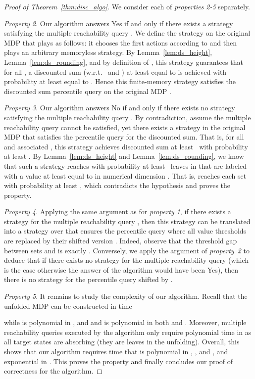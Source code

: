 \documentclass{llncs}
\begin{document}
\begin{proof}[Proof of Theorem~\ref{thm:disc_algo}] We consider each of \textit{properties 2-5} separately.

\textit{Property 2}. Our algorithm answers \textsf{Yes} if and only if there exists a strategy  satisfying the multiple reachability query . We define the strategy  on the original MDP  that plays as follows: it chooses the  first actions according to  and then plays an arbitrary memoryless strategy. By Lemma~\ref{lem:ds_height}, Lemma~\ref{lem:ds_rounding}, and by definition of , this strategy guarantees that for all , a discounted sum (w.r.t.~ and ) at least equal to  is achieved with probability at least equal to . Hence this finite-memory strategy  satisfies the discounted sum percentile query on the original MDP .
	
\textit{Property 3}. Our algorithm answers \textsf{No} if and only if there exists no strategy  satisfying the multiple reachability query . By contradiction, assume the multiple reachability query cannot be satisfied, yet there exists a strategy  in the original MDP  that satisfies the percentile query for the discounted sum. That is, for all  and associated , this strategy achieves discounted sum at least~ with probability at least . By Lemma~\ref{lem:ds_height} and Lemma~\ref{lem:ds_rounding}, we know that such a strategy reaches with probability at least~ leaves in  that are labeled with a value at least equal to  in numerical dimension . That is,  reaches each set  with probability at least , which contradicts the hypothesis and proves the property.

\textit{Property 4}. Applying the same argument as for \textit{property 1}, if there exists a strategy  for the multiple reachability query , then this strategy can be translated into a strategy  over  that ensures the percentile query where all value thresholds  are replaced by their shifted version . Indeed, observe that the threshold gap between sets  and  is exactly . Conversely, we apply the argument of \textit{property~2} to deduce that if there exists no strategy for the multiple reachability query  (which is the case otherwise the answer of the algorithm would have been \textsf{Yes}), then there is no strategy for the percentile query shifted by . 

\textit{Property 5}. It remains to study the complexity of our algorithm. Recall that the unfolded MDP  can be constructed in time

while  is polynomial in ,  and  and  is polynomial in both  and . Moreover, multiple reachability queries executed by the algorithm only require polynomial time in  as all target states are absorbing (they are leaves in the unfolding). Overall, this shows that our algorithm requires time that is polynomial in , ,  and , and exponential in . This proves the property and finally concludes our proof of correctness for the algorithm.
\end{proof}
\end{document}
